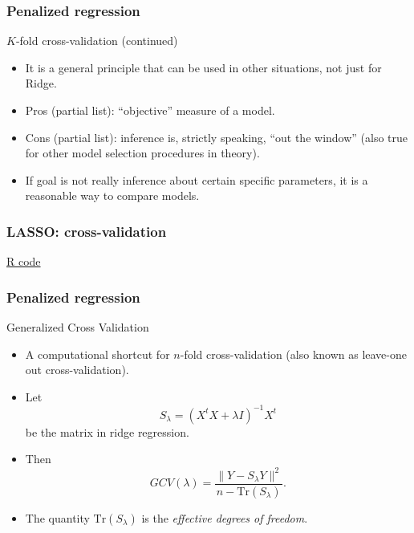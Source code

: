 \documentclass[handout]{beamer}
\newcommand{\Tr}{\text{Tr}}
\begin{document}

   \begin{frame} \frametitle{Penalized regression}

   \begin{block}
   {$K$-fold cross-validation   (continued)                  }
       \begin{itemize}

       \item It is a general principle that can be used in other situations, not just for Ridge.


       \item Pros (partial list): ``objective'' measure of a model.

       \item Cons (partial list): inference is, strictly speaking, ``out the window'' (also true for other model selection procedures in theory).

       \item If goal is not really inference about certain specific parameters, it is a reasonable way to compare models.
       \end{itemize}

   \end{block}
   \end{frame}



   \begin{frame}
   \frametitle{LASSO: cross-validation}
   \begin{center}
   \end{center}
   \href{http://www.stanford.edu/class/stats191/penalized.html#lasso}{R code}
   \end{frame}


   \begin{frame} \frametitle{Penalized regression}

   \begin{block}
   { Generalized Cross Validation}
       \begin{itemize}

       \item A computational shortcut for $n$-fold cross-validation (also known as leave-one out cross-validation).

       \item Let
   $$
   S_{\lambda} = (X^tX + \lambda I)^{-1} X^t$$
   be the matrix in ridge regression.

   \item Then
   $$
   GCV(\lambda) =  \frac{\|Y - S_{\lambda}Y\|^2}{n - \Tr(S_{\lambda})}.$$

   \item The quantity $\Tr(S_{\lambda})$ is the {\em effective degrees of freedom}.
       \end{itemize}

   \end{block}
   \end{frame}
\end{document}
